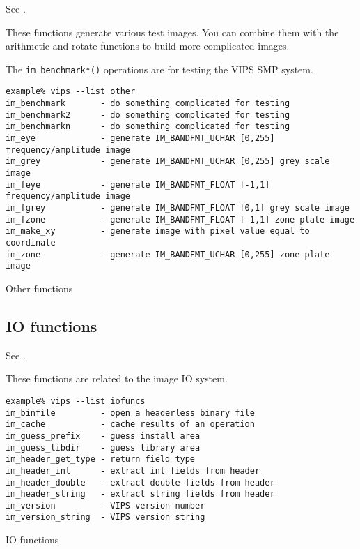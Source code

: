 See .

These functions generate various test images. You can combine them with
the arithmetic and rotate functions to build more complicated images.

The \verb+im_benchmark*()+ operations are for testing the VIPS SMP system.

\begin{fig2}
\begin{verbatim}
example% vips --list other
im_benchmark       - do something complicated for testing
im_benchmark2      - do something complicated for testing
im_benchmarkn      - do something complicated for testing
im_eye             - generate IM_BANDFMT_UCHAR [0,255] frequency/amplitude image
im_grey            - generate IM_BANDFMT_UCHAR [0,255] grey scale image
im_feye            - generate IM_BANDFMT_FLOAT [-1,1] frequency/amplitude image
im_fgrey           - generate IM_BANDFMT_FLOAT [0,1] grey scale image
im_fzone           - generate IM_BANDFMT_FLOAT [-1,1] zone plate image
im_make_xy         - generate image with pixel value equal to coordinate
im_zone            - generate IM_BANDFMT_UCHAR [0,255] zone plate image
\end{verbatim}
\caption{Other functions}
\label{fg:other}
\end{fig2}

\subsection{IO functions}

See .

These functions are related to the image IO system. 

\begin{fig2}
\begin{verbatim}
example% vips --list iofuncs
im_binfile         - open a headerless binary file
im_cache           - cache results of an operation
im_guess_prefix    - guess install area
im_guess_libdir    - guess library area
im_header_get_type - return field type
im_header_int      - extract int fields from header
im_header_double   - extract double fields from header
im_header_string   - extract string fields from header
im_version         - VIPS version number
im_version_string  - VIPS version string
\end{verbatim}
\caption{IO functions}
\label{fg:io}
\end{fig2}

